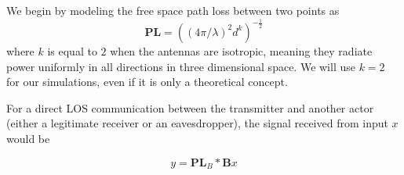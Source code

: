 We begin by modeling the free space path loss \cite{Free_space_path_loss} between two points as
\begin{equation}
  \bm{PL} = ((4 \pi / \lambda)^2 d^k)^{-\frac{1}{2}}
\end{equation}
where $k$ is equal to $2$ when the antennas are isotropic, meaning they radiate power uniformly in all directions in three dimensional space. We will use $k = 2$ for our simulations, even if it is only a theoretical concept.

For a direct LOS communication between the transmitter and another actor (either a legitimate receiver or an eavesdropper), the signal received from input $x$ would be

\begin{equation}
  y = \bm{PL}_B * \bm{B}x
\end{equation}


